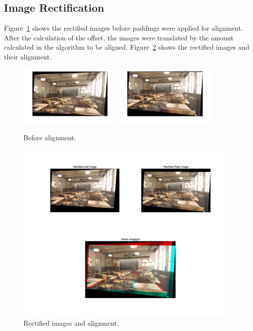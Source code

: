 \subsection{Image Rectification}
Figure~\ref{fig:before_alignment} shows the rectified images before paddings were applied for alignment. After the calculation of the offset, the images were translated by the amount calculated in the algorithm to be aligned. Figure~\ref{fig:rectified} shows the rectified images and their alignment.
\begin{figure}[h!]
	\centering
	\includegraphics[width=0.45\textwidth]{../code/rectified_left.png}
	\includegraphics[width=0.45\textwidth]{../code/rectified_right.png}
	\caption{Before alignment.}
	\label{fig:before_alignment}
\end{figure}

\begin{figure}[h!]
	\centering
	\includegraphics[width=\textwidth]{../code/rectified.png}
	\caption{Rectified images and alignment.}
	\label{fig:rectified}
\end{figure}

